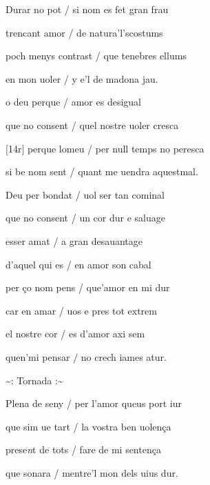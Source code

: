 \documentclass[12pt]{article}
\begin{document}
\begin{estrofa}

 Durar no pot / si nom es fet gran frau

 trencant amor / de natura'l'scostums

 poch menys contrast / que tenebres ellums

 en mon uoler / y e'l de madona jau.

 o deu perque / amor es desigual

 que no consent / quel nostre uoler cresca

 [14r] perque lomeu / per null temps no peresca

 si be nom sent / quant me uendra aquestmal.

\end{estrofa}



\begin{estrofa}

 Deu per bondat / uol ser tan cominal

 que no consent / un cor dur e saluage

 esser amat / a gran desauantage

 d'aquel qui es / en amor son cabal

 per \c{c}o nom pens / que'amor en mi dur

 car en amar / uos e pres tot extrem

 el nostre cor / es d'amor axi sem

 quen'mi pensar / no crech iames atur.

\end{estrofa}


\begin{estrofaExtra}%




\begin{tornada}

\textasciitilde{}: Tornada
:\textasciitilde{}

\end{tornada}


\end{estrofaExtra}


\begin{estrofa}

 Plena de seny / per l'amor queus port iur

 que sim ue tart / la vostra ben uolen\c{c}a

 prese\textit{n}t de tots / fare de mi senten\c{c}a

 que sonara / mentre'l mon dels uius dur.

\end{estrofa}
\end{document}

